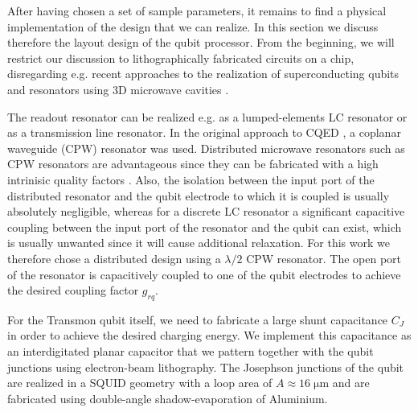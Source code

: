 After having chosen a set of sample parameters, it remains to find a physical implementation of the design that we can realize. In this section we discuss therefore the layout design of the qubit processor. From the beginning, we will restrict our discussion to lithographically fabricated circuits on a chip, disregarding e.g. recent approaches to the realization of superconducting qubits and resonators using 3D microwave cavities \citep{paik_observation_2011}.

\smallskip

The readout resonator can be realized e.g. as a lumped-elements LC resonator or as a transmission line resonator. In the original approach to CQED \citep{wallraff_strong_2004}, a coplanar waveguide (CPW) resonator was used. Distributed microwave resonators such as CPW resonators are advantageous since they can be fabricated with a high intrinisic quality factors \citep{}. Also, the isolation between the input port of the distributed resonator and the qubit electrode to which it is coupled is usually absolutely negligible, whereas for a discrete LC resonator a significant capacitive coupling between the input port of the resonator and the qubit can exist, which is usually unwanted since it will cause additional relaxation. For this work we therefore chose a distributed design using a $\lambda/2$ CPW resonator. The open port of the resonator is capacitively coupled to one of the qubit electrodes to achieve the desired coupling factor $g_{rq}$.

\smallskip

For the Transmon qubit itself, we need to fabricate a large shunt capacitance $C_J$ in order to achieve the desired charging energy. We implement this capacitance as an interdigitated planar capacitor that we pattern together with the qubit junctions using electron-beam lithography. The Josephson junctions of the qubit are realized in a SQUID geometry with a loop area of $A\approx 16\;\mathrm{\mu m}$ and are fabricated using double-angle shadow-evaporation of Aluminium.

